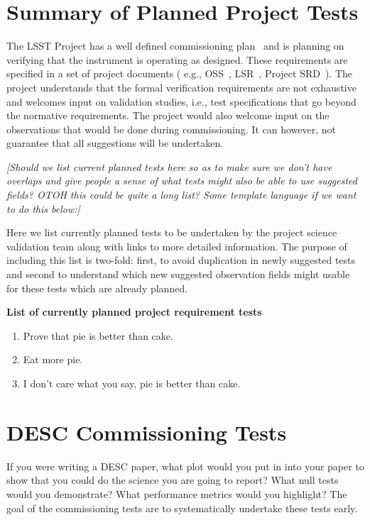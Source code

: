 \documentclass[modern]{desc-tex/styles/lsstdescnote}
\begin{document}
\section{Summary of Planned Project Tests}
\label{sec:project-tests}

The LSST Project has a well defined commissioning plan~\cite{?} and is planning on verifying that the instrument is operating as designed.  These requirements are specified in a set of project documents ( e.g., OSS~\cite{?}, LSR~\cite{?}, Project SRD~\cite{?}). The project understands that the formal verification requirements are not exhaustive and welcomes input on validation studies, i.e., test specifications that go beyond the normative requirements. The project would also welcome input on the observations that would be done during commissioning. It can however, not guarantee that all suggestions will be undertaken.

{\it [Should we list current planned tests here so as to make sure we don't have overlaps and give people a sense of what tests might also be able to use suggested fields?  OTOH this could be quite a long list?  Some template language if we want to do this below:] }

Here we list currently planned tests to be undertaken by the project science validation team along with links to more detailed information.  The purpose of including this list is two-fold: first, to avoid duplication in newly suggested tests and second to understand which new suggested observation fields might usable for these tests which are already planned.

\noindent
{\bf List of currently planned project requirement tests}
\begin{enumerate}
\item Prove that pie is better than cake.
\item Eat more pie.
\item I don't care what you say, pie is better than cake.
\end{enumerate}

\section{DESC Commissioning Tests}

If you were writing a DESC paper, what plot would you put in into your paper to show that you could do the science you are going to report? What null tests would you demonstrate?  What performance metrics would you highlight?  The goal of the commissioning tests are to systematically undertake these tests early.
\end{document}
